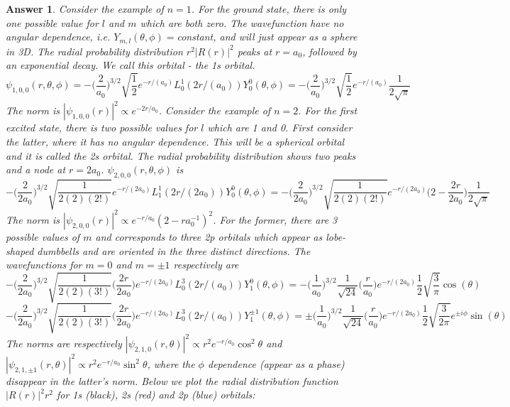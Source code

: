 \documentclass[a4paper]{article}
\newtheorem{ans}{Answer}[subsection]
\theoremstyle{new}
\begin{document}
\begin{ans}
Consider the example of $n=1$. For the ground state, there is only one possible value for $l$ and $m$ which are both zero. The wavefunction have no angular dependence, i.e. $Y_{m,l}(\theta,\phi)=$constant, and will just appear as a sphere in 3D. The radial probability distribution $r^2|R(r)|^2$ peaks at $r=a_0$, followed by an exponential decay. We call this orbital - the 1s orbital.
$$\psi_{1,0,0}(r,\theta,\phi)=-\bigg(\frac{2}{a_0}\bigg)^{3/2}\sqrt{\frac{1}{2}}e^{-r/(a_0)}L_{0}^{1}(2r/(a_0))Y_0^0(\theta,\phi)=-\bigg(\frac{2}{a_0}\bigg)^{3/2}\sqrt{\frac{1}{2}}e^{-r/(a_0)}\frac{1}{2\sqrt{\pi}}$$
The norm is $|\psi_{1,0,0}(r)|^2\propto e^{-2r/a_0}$. Consider the example of $n=2$. For the first excited state, there is two possible values for $l$ which are 1 and 0. First consider the latter, where it has no angular dependence. This will be a spherical orbital and it is called the 2s orbital. The radial probability distribution shows two peaks and a node at $r=2a_0$. $\psi_{2,0,0}(r,\theta,\phi)$ is
$$-\bigg(\frac{2}{2a_0}\bigg)^{3/2}\sqrt{\frac{1}{2(2)(2!)}}e^{-r/(2a_0)}L_{1}^{1}(2r/(2a_0))Y_0^0(\theta,\phi)=-\bigg(\frac{2}{2a_0}\bigg)^{3/2}\sqrt{\frac{1}{2(2)(2!)}}e^{-r/(2a_0)}\bigg(2-\frac{2r}{2a_0}\bigg)\frac{1}{2\sqrt{\pi}}$$
The norm is $|\psi_{2,0,0}(r)|^2\propto e^{-r/a_0}(2-ra_0^{-1})^2$. For the former, there are 3 possible values of $m$ and corresponds to three 2p orbitals which appear as lobe-shaped dumbbells and are oriented in the three distinct directions. The wavefunctions for $m=0$ and $m=\pm1$ respectively are
$$-\bigg(\frac{2}{2a_0}\bigg)^{3/2}\sqrt{\frac{1}{2(2)(3!)}}\bigg(\frac{2r}{2a_0}\bigg)e^{-r/(2a_0)}L_{0}^{3}(2r/(a_0))Y_1^0(\theta,\phi)=-\bigg(\frac{1}{a_0}\bigg)^{3/2}\frac{1}{\sqrt{24}}\bigg(\frac{r}{a_0}\bigg)e^{-r/(2a_0)}\frac{1}{2}\sqrt{\frac{3}{\pi}}\cos(\theta)$$
$$-\bigg(\frac{2}{2a_0}\bigg)^{3/2}\sqrt{\frac{1}{2(2)(3!)}}\bigg(\frac{2r}{2a_0}\bigg)e^{-r/(2a_0)}L_{0}^{3}(2r/(a_0))Y_1^{\pm1}(\theta,\phi)=\pm\bigg(\frac{1}{a_0}\bigg)^{3/2}\frac{1}{\sqrt{24}}\bigg(\frac{r}{a_0}\bigg)e^{-r/(2a_0)}\frac{1}{2}\sqrt{\frac{3}{2\pi}}e^{\pm i\phi}\sin(\theta)$$
The norms are respectively  $|\psi_{2,1,0}(r,\theta)|^2\propto r^2e^{-r/a_0}\cos^2\theta$ and $|\psi_{2,1,\pm1}(r,\theta)|^2\propto r^2e^{-r/a_0}\sin^2\theta$, where the $\phi$ dependence (appear as a phase) disappear in the latter's norm. Below we plot the radial distribution function $|R(r)|^2r^2$ for 1s (black), 2s (red) and 2p (blue) orbitals:
\begin{center}
\end{center}
\end{ans}
\end{document}
